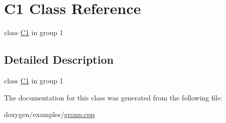\hypertarget{class_c1}{}\section{C1 Class Reference}
\label{class_c1}


class \mbox{\hyperlink{class_c1}{C1}} in group 1  




\subsection{Detailed Description}
class \mbox{\hyperlink{class_c1}{C1}} in group 1 

The documentation for this class was generated from the following file\+:\begin{DoxyCompactItemize}
\item 
doxygen/examples/\mbox{\hyperlink{group_8cpp}{group.\+cpp}}\end{DoxyCompactItemize}

